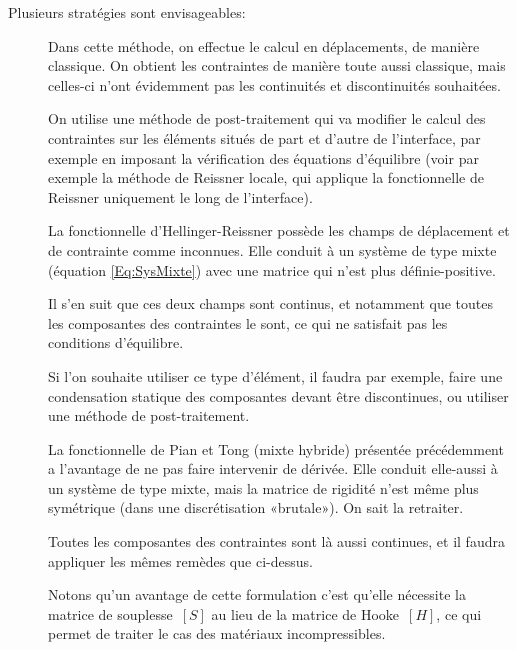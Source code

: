 \bigskip
Plusieurs stratégies sont envisageables:
\begin{description}
\item[]

	Dans cette méthode, on effectue le calcul en déplacements, de manière classique.
	On obtient les contraintes de manière toute aussi classique, mais celles-ci
	n'ont évidemment pas les continuités et discontinuités souhaitées.

	On utilise une méthode de post-traitement qui va modifier le calcul des contraintes
	sur les éléments situés de part et d'autre de l'interface, par exemple
	en imposant la vérification des équations d'équilibre (voir par exemple
	la méthode de Reissner locale, qui applique la fonctionnelle de Reissner uniquement
	le long de l'interface).
\item[]

	La fonctionnelle d'Hellinger-Reissner
	possède les champs de déplacement et de
	contrainte comme inconnues. Elle conduit à un système de type mixte
	(équation \eqref{Eq:SysMixte}) avec une matrice qui n'est plus définie-positive.

	Il s'en suit que ces deux champs sont continus, et notamment que toutes les
	composantes des contraintes le sont, ce qui ne satisfait pas les conditions
	d'équilibre.

	Si l'on souhaite utiliser ce type d'élément, il faudra par exemple, faire une
	condensation statique des composantes devant être discontinues, ou
	utiliser une méthode de post-traitement.
\item[]

	La fonctionnelle de Pian et Tong (mixte hybride)
	présentée précédemment
	a l'avantage de ne pas faire intervenir de dérivée. Elle conduit elle-aussi
	à un système de type mixte, mais la matrice de rigidité n'est même
	plus symétrique (dans une discrétisation «brutale»). On sait la retraiter.

	Toutes les composantes des contraintes sont là aussi continues, et il faudra appliquer les
	mêmes remèdes que ci-dessus.

	Notons qu'un avantage de cette formulation c'est qu'elle nécessite la matrice
	de souplesse~$[S]$ au lieu de la matrice de Hooke~$[H]$, ce qui permet de
	traiter le cas des matériaux incompressibles.
\item[]
	

\end{description}
